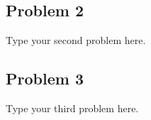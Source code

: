 \documentclass[11pt]{article}
\begin{document}
\subsection*{Problem 2}
Type your second problem here.


\subsection*{Problem 3}
Type your third problem here.
\end{document}
